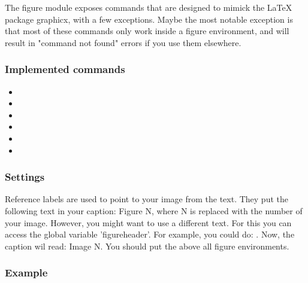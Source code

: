 \begin{paragraph}
    The figure module exposes commands that are designed to mimick the LaTeX package graphicx, with a few exceptions. 
    Maybe the most notable exception is that most of these commands only work inside a figure environment, and will result in "command not found" errors if you use them elsewhere.
\end{paragraph}

\subsubsection{Implemented commands}
\begin{itemize}
    \item{}
    \item{}
    \item{}
    \item{}
    \item{}
    \item{}
\end{itemize}

\subsubsection{Settings}
\begin{paragraph}
    Reference labels are used to point to your image from the text. They put the following text in your caption: Figure N, where N is replaced with the number of your image. However, you might want to use a different text. For this you can access the global variable 'figureheader'. For example, you could do: . Now, the caption wil read: Image N. You should put the  above all figure environments.
\end{paragraph}

\subsubsection{Example}
\begin{code}
\end{code}

